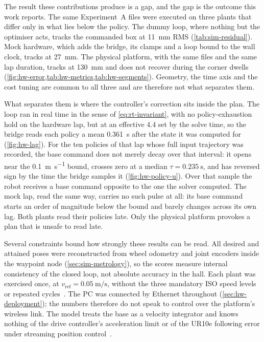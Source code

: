 The result these contributions produce is a gap, and the gap is the
outcome this work reports. The same Experiment~A files were executed on
three plants that differ only in what lies below the policy. The dummy
loop, where nothing but the optimiser acts, tracks the commanded box at
\qty{11}{\milli\meter} RMS (\cref{tab:sim-residual}). Mock hardware,
which adds the bridge, its clamps and a loop bound to the wall clock,
tracks at \qty{27}{\milli\meter}. The physical platform, with the same
files and the same lap duration, tracks at \qty{130}{\milli\meter} and
does not recover during the corner dwells
(\cref{fig:hw-error,tab:hw-metrics,tab:hw-segments}). Geometry, the
\ocs{} time axis and the cost tuning are common to all three and are
therefore not what separates them.

What separates them is where the controller's correction sits inside the
plan. The loop ran in real time in the sense of \cref{eq:rt-invariant},
with no policy-exhaustion hold on the hardware lap, but at an effective
\qty{4.4}{\hz} set by the solve time, so the bridge reads each policy a
mean \qty{0.361}{\second} after the state it was computed for
(\cref{fig:hw-lag}). For the ten policies of that lap whose full input
trajectory was recorded, the base command does not merely decay over
that interval: it opens near the \qty{0.1}{\meter\per\second} bound,
crosses zero at a median $\tau = \qty{0.235}{\second}$, and has reversed
sign by the time the bridge samples it (\cref{fig:hw-policy-u}). Over
that sample the robot receives a base command opposite to the one the
solver computed. The mock lap, read the same way, carries no such pulse
at all: its base command starts an order of magnitude below the bound
and barely changes across its own lag. Both plants read their policies
late. Only the physical platform provokes a plan that is unsafe to read
late.

Several constraints bound how strongly these results can be read. All
desired and attained poses were reconstructed from wheel odometry and
joint encoders inside the waypoint node (\cref{sec:sim-metrology}), so
the scores measure internal consistency of the closed loop, not absolute
accuracy in the hall. Each plant was exercised once, at
$v_{\mathrm{ref}}=\qty{0.05}{\meter\per\second}$, without the three
mandatory ISO speed levels or repeated cycles~\cite{ISO9283}. The
PC was connected by Ethernet throughout
(\cref{sec:hw-deployment}); the numbers therefore do not speak to
control over the platform's wireless link. The \ocs{} model treats the
base as a velocity integrator and knows nothing of the drive
controller's acceleration limit or of the UR10e following error under
streaming position
control~\cite{HenkelRoth2019freeMoVe,UR10e}.

